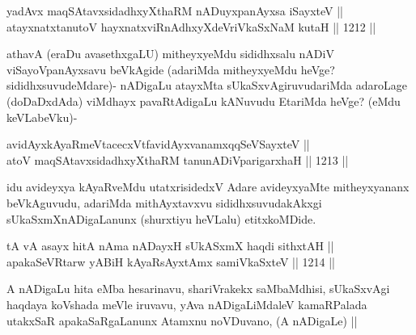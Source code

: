 \begin{shl}
yadAvx maqSAtavxsidadhxyXthaRM nADuyxpanAyxsa iSayxteV || \\
atayxnatxtanutoV hayxnatxviRnAdhxyXdeVriVkaSxNaM kutaH ||  1212 ||  
\end{shl}

\begin{artha}
athavA (eraDu avasethxgaLU) mitheyxyeMdu sididhxsalu nADiV viSayoVpanAyxsavu beVkAgide (adariMda mitheyxyeMdu heVge? sididhxsuvudeMdare)- nADigaLu atayxMta sUkaSxvAgiruvudariMda adaroLage (doDaDxdAda) viMdhayx pavaRtAdigaLu kANuvudu EtariMda heVge? (eMdu keVLabeVku)-
\end{artha}

\begin{shl}
avidAyxkAyaRmeVtacecxVtf\footnotemark[1] avidAyxvanamxqqSeVSayxteV || \\
atoV maqSAtavxsidadhxyXthaRM tanunADiVparigarxhaH ||  1213 ||  
\end{shl}

\begin{artha}
idu avideyxya kAyaRveMdu utatxrisidedxV Adare avideyxyaMte mitheyxyananx beVkAguvudu, adariMda mithAyxtavxvu sididhxsuvudakAkxgi sUkaSxmXnADigaLanunx (shurxtiyu heVLalu) etitxkoMDide.
\end{artha}


\begin{shl}
tA vA asayx hitA nAma nADayxH sUkASxmX haqdi sithxtAH || \\
apakaSeVRtarw yABiH kAyaRsAyx\s \s tAmx samiVkaSxteV ||  1214 ||  
\end{shl}

\begin{artha}
A nADigaLu hita eMba hesarinavu, shariVrakekx saMbaMdhisi, sUkaSxvAgi haqdaya koVshada meVle iruvavu, yAva nADigaLiMdaleV kamaRPalada utakxSaR apakaSaRgaLanunx Atamxnu noVDuvano, (A nADigaLe) ||
\end{artha}



